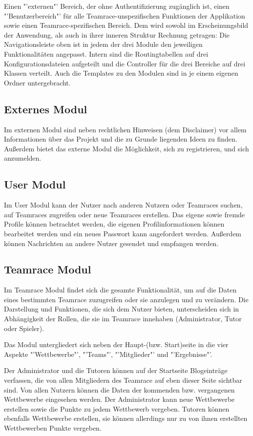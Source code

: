 \documentclass[12pt]{report}
\begin{document}
Einen "'externen"' Bereich, der ohne Authentifizierung zugänglich ist, einen "'Benutzerbereich"' für alle Teamrace-unspezifischen Funktionen der Applikation sowie einen Teamrace-spezifischen Bereich. Dem wird sowohl im Erscheinungsbild der Anwendung, als auch in ihrer inneren Struktur Rechnung getragen: Die Navigationsleiste oben ist in jedem der drei Module den jeweiligen Funktionalitäten angepasst. Intern sind die Routingtabellen auf drei Konfigurationsdateien aufgeteilt und die Controller für die drei Bereiche auf drei Klassen verteilt. Auch die Templates zu den Modulen sind in je einem eigenen Ordner untergebracht.

\subsection{Externes Modul}
Im externen Modul sind neben rechtlichen Hinweisen (dem Disclaimer) vor allem Informationen über das Projekt und die zu Grunde liegenden Ideen zu finden. Außerdem bietet das externe Modul die Möglichkeit, sich zu registrieren, und sich anzumelden.

\subsection{User Modul}
Im User Modul kann der Nutzer nach anderen Nutzern oder Teamraces suchen, auf Teamraces zugreifen oder neue Teamraces erstellen. Das eigene sowie fremde Profile können betrachtet werden, die eigenen Profilinformationen können bearbeitet werden und ein neues Passwort kann angefordert werden. Außerdem können Nachrichten an andere Nutzer gesendet und empfangen werden.

\subsection{Teamrace Modul}
Im Teamrace Modul findet sich die gesamte Funktionalität, um auf die Daten eines bestimmten Teamrace zuzugreifen oder sie anzulegen und zu verändern. Die Darstellung und Funktionen, die sich dem Nutzer bieten, unterscheiden sich in Abhängigkeit der Rollen, die sie im Teamrace innehaben (Administrator, Tutor oder Spieler). 

Das Modul untergliedert sich neben der Haupt-(bzw. Start)seite in die vier Aspekte "'Wettbewerbe"', "'Teams"', "'Mitglieder"' und "'Ergebnisse"'.

Der Administrator und die Tutoren können auf der Startseite Blogeinträge verfassen, die von allen Mitgliedern des Teamrace auf eben dieser Seite sichtbar sind. Von allen Nutzern können die Daten der kommenden bzw. vergangenen Wettbewerbe eingesehen werden. Der Administrator kann neue Wettbewerbe erstellen sowie die Punkte zu jedem Wettbewerb vergeben. Tutoren können ebenfalls Wettbewerbe erstellen, sie können allerdings nur zu von ihnen erstellten Wettbewerben Punkte vergeben. 
\end{document}
